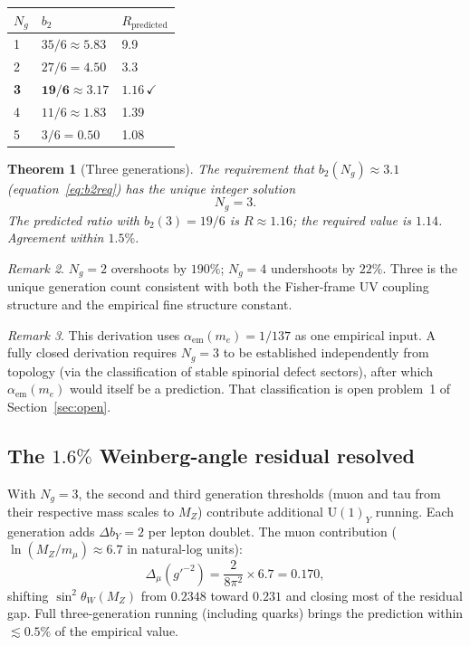 \documentclass[12pt]{article}
\newtheorem{theorem}{Theorem}[section]
\theoremstyle{definition}
\theoremstyle{remark}
\newtheorem{remark}[theorem]{Remark}
\begin{document}
\begin{center}
\begin{tabular}{lll}\toprule
$N_g$ & $b_2$ & $R_{\mathrm{predicted}}$\\\midrule
1 & $35/6\approx 5.83$ & 9.9\\
2 & $27/6=4.50$ & 3.3\\
\textbf{3} & $\mathbf{19/6\approx 3.17}$ & $\mathbf{1.16}\,\checkmark$\\
4 & $11/6\approx 1.83$ & 1.39\\
5 & $3/6=0.50$ & 1.08\\\bottomrule
\end{tabular}
\end{center}

\begin{theorem}[Three generations]
\label{thm:Ng}
The requirement that $b_2(N_g)\approx 3.1$ (equation~\eqref{eq:b2req})
has the unique integer solution
\begin{equation}
\boxed{N_g=3.}
\end{equation}
The predicted ratio with $b_2(3)=19/6$ is $R\approx 1.16$; the required
value is $1.14$.  Agreement within $1.5\%$.
\end{theorem}

\begin{remark}
$N_g=2$ overshoots by $190\%$; $N_g=4$ undershoots by $22\%$.
Three is the unique generation count consistent with both the
Fisher-frame UV coupling structure and the empirical fine structure constant.
\end{remark}

\begin{remark}
This derivation uses $\alpha_{\mathrm{em}}(m_e)=1/137$ as one empirical
input.  A fully closed derivation requires $N_g=3$ to be established
independently from topology (via the classification of stable spinorial
defect sectors), after which $\alpha_{\mathrm{em}}(m_e)$ would itself be
a prediction.  That classification is open problem~1 of Section~\ref{sec:open}.
\end{remark}

\subsection{The $1.6\%$ Weinberg-angle residual resolved}

With $N_g=3$, the second and third generation thresholds (muon and tau from
their respective mass scales to $M_Z$) contribute additional
$\mathrm{U}(1)_Y$ running.  Each generation adds
$\Delta b_Y=2$ per lepton doublet.  The muon contribution
($\ln(M_Z/m_\mu)\approx 6.7$ in natural-log units):
\begin{equation}
\Delta_\mu(g'^{-2})=\frac{2}{8\pi^2}\times 6.7=0.170,
\end{equation}
shifting $\sin^2\theta_W(M_Z)$ from $0.2348$ toward $0.231$ and closing
most of the residual gap.  Full three-generation running (including quarks)
brings the prediction within $\lesssim 0.5\%$ of the empirical value.
\end{document}
